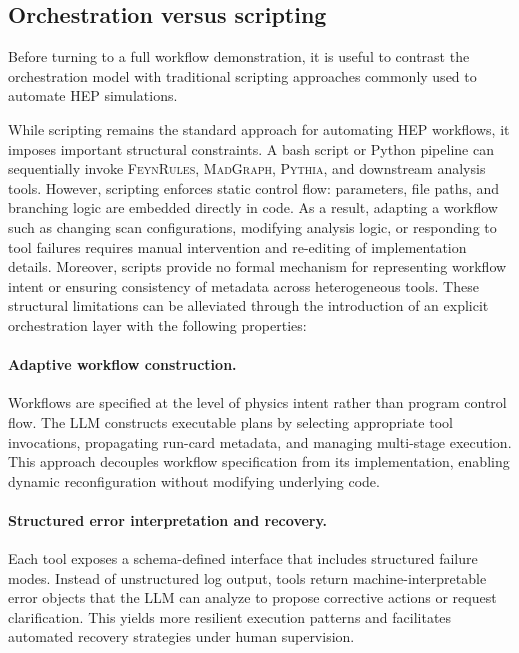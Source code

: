 \documentclass[11pt,oneside]{article}
\numberwithin{equation}{section}
\begin{document}
\subsection{Orchestration versus scripting}

Before turning to a full workflow demonstration, it is useful to contrast the orchestration model with traditional scripting approaches commonly used to automate HEP simulations.

While scripting remains the standard approach for automating HEP workflows, it imposes important structural constraints. 
A bash script or Python pipeline can sequentially invoke \textsc{FeynRules}, \textsc{MadGraph}, \textsc{Pythia}, and downstream analysis tools. 
However, scripting enforces static control flow: parameters, file paths, and branching logic are embedded directly in code. 
As a result, adapting a workflow such as changing scan configurations, modifying analysis logic, or responding to tool failures requires manual intervention and re-editing of implementation details. 
Moreover, scripts provide no formal mechanism for representing workflow intent or ensuring consistency of metadata across heterogeneous tools.
These structural limitations can be alleviated through the introduction of an explicit orchestration layer with the following properties:

\paragraph{Adaptive workflow construction.}
Workflows are specified at the level of physics intent rather than program control flow. 
The LLM constructs executable plans by selecting appropriate tool invocations, propagating run-card metadata, and managing multi-stage execution. 
This approach decouples workflow specification from its implementation, enabling dynamic reconfiguration without modifying underlying code.

\paragraph{Structured error interpretation and recovery.}
Each tool exposes a schema-defined interface that includes structured failure modes. 
Instead of unstructured log output, tools return machine-interpretable error objects that the LLM can analyze to propose corrective actions or request clarification. This yields more resilient execution patterns and facilitates automated recovery strategies under human supervision.
\end{document}
